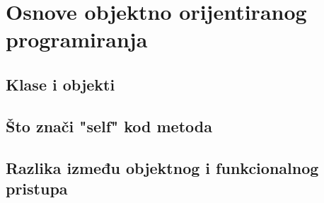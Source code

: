 \chapter{Osnove objektno orijentiranog programiranja}

\section{Klase i objekti}

\section{Što znači "self" kod metoda}

\section{Razlika između objektnog i funkcionalnog pristupa}


